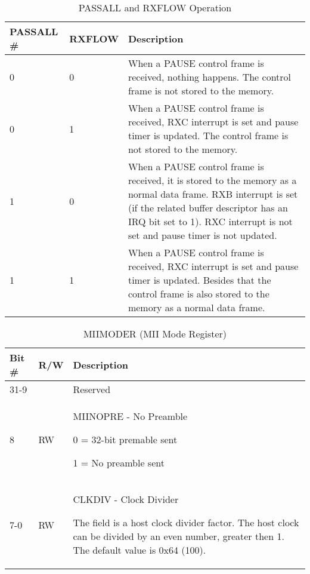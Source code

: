 \begin{table}[H]
  \centering
  \begin{tabularx}{\textwidth}{|l|l|X|}
    
    \hline
    \rowcolor{iob-green}
    {\bf PASSALL \#} & {\bf RXFLOW} & {\bf Description} \\ \hline

    0   & 0 &   When a PAUSE control frame is received, nothing happens. The
                control frame is not stored to the memory.\\ \hline
    \rowcolor{iob-blue}
    0   & 1 &   When a PAUSE control frame is received, RXC interrupt is set
                and pause timer is updated. The control frame is not stored to
                the memory.\\ \hline
    1   & 0 &   When a PAUSE control frame is received, it is stored to the
                memory as a normal data frame. RXB interrupt is set (if the
                related buffer descriptor has an IRQ bit set to 1). RXC
                interrupt is not set and pause timer is not updated.\\ \hline
    \rowcolor{iob-blue}
    1   & 1 &   When a PAUSE control frame is received, RXC interrupt is set
                and pause timer is updated. Besides that the control frame is
                also stored to the memory as a normal data frame.\\ \hline
  \end{tabularx}
    \caption{PASSALL and RXFLOW Operation}
  \label{swreg_details:passall_rxflow}
\end{table}

\begin{table}[H]
  \centering
  \begin{tabularx}{\textwidth}{|l|l|X|}
    
    \hline
    \rowcolor{iob-green}
    {\bf Bit \#} & {\bf R/W} & {\bf Description} \\ \hline

    31-9   &   & Reserved \\ \hline
    \rowcolor{iob-blue}
    8      & RW & MIINOPRE - No Preamble

                0 = 32-bit premable sent

                1 = No preamble sent\\ \hline
    7-0      & RW &   CLKDIV - Clock Divider

                The field is a host clock divider factor. The host clock can be
                divided by an even number, greater then 1. The default value is
                0x64 (100).\\ \hline
  \end{tabularx}
    \caption{MIIMODER (MII Mode Register)}
  \label{swreg_details:miimoder}
\end{table}

